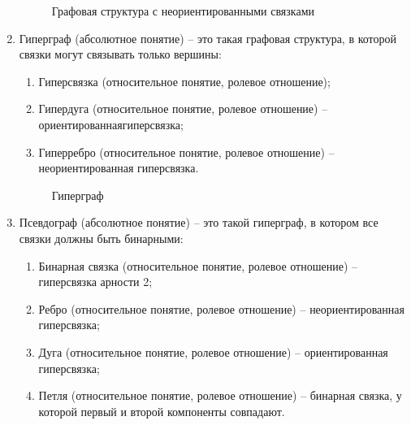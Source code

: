 \documentclass[a4paper]{article}
\begin{document}
\begin{enumerate}
\begin{figure}[!ht]
      \caption{Графовая структура с неориентированными связками}
    \end{figure}
\newpage
  \item Гиперграф (абсолютное понятие) – это такая графовая структура, в которой связки могут связывать только вершины:
    \begin{enumerate}
      \item Гиперсвязка (относительное понятие, ролевое отношение);
      \item Гипердуга (относительное понятие, ролевое отношение) – ориентированнаягиперсвязка;
      \item Гиперребро (относительное понятие, ролевое отношение) – неориентированная гиперсвязка.
    \end{enumerate}
    \begin{figure}[!ht]
      \caption{Гиперграф}
    \end{figure}
\newpage
  \item Псевдограф (абсолютное понятие) – это такой гиперграф, в котором все связки должны быть бинарными:
    \begin{enumerate}
      \item Бинарная связка (относительное понятие, ролевое отношение) – гиперсвязка арности 2;
      \item Ребро (относительное понятие, ролевое отношение) – неориентированная гиперсвязка;
      \item Дуга (относительное понятие, ролевое отношение) – ориентированная гиперсвязка;
      \item Петля (относительное понятие, ролевое отношение) – бинарная связка, у которой первый и второй компоненты совпадают.

\end{enumerate}
\end{enumerate}
\end{document}
